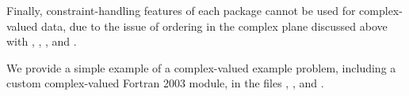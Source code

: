 Finally, constraint-handling features of each package cannot be used
for complex-valued data, due to the issue of
ordering in the complex plane discussed above with
, , ,
 and .

We provide a simple example of a complex-valued example problem,
including a custom complex-valued Fortran 2003 {\nvector} module, in the
files
\newline\noindent{},
\newline\noindent{}, and
\newline\noindent{}.
